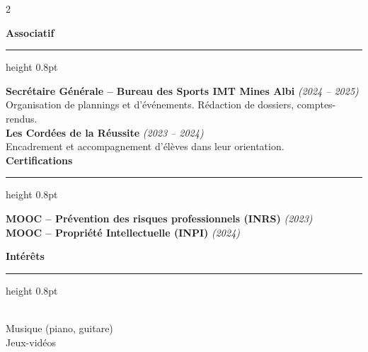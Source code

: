 \documentclass[10.5pt,a4paper]{article}
\newcommand{\subsectitle}[1]{%
  {\color{accent}\bfseries\large #1}\\[-2pt]
  {\color{accent}\hrule height 0.8pt}\vspace{5pt}
}
\newcommand{\sidebardated}[3]{%
  \textbf{\small #1} {\itshape\color{graytext}\footnotesize (#2)}\\
  {\small #3}\\[3pt]
}
\newcommand{\sidebarcert}[2]{%
  \noindent\textbf{\small #1} {\itshape\color{graytext}\footnotesize (#2)}\\[2pt]
}
\begin{document}
\begin{paracol}{2}
\vspace{5pt}

\subsectitle{Associatif}

\sidebardated{Secrétaire Générale -- Bureau des Sports IMT Mines Albi}{2024 -- 2025}{Organisation de plannings et d'événements. Rédaction de dossiers, comptes-rendus.}

\sidebardated{Les Cordées de la Réussite}{2023 -- 2024}{Encadrement et accompagnement d'élèves dans leur orientation.}

\subsectitle{Certifications}

\sidebarcert{MOOC -- Prévention des risques professionnels (INRS)}{2023}
\sidebarcert{MOOC -- Propriété Intellectuelle (INPI)}{2024}

\vspace{4pt}

\subsectitle{Intérêts}
\\
{\small Musique (piano, guitare)}\\
{\small Jeux-vidéos}

\end{paracol}
\end{document}
